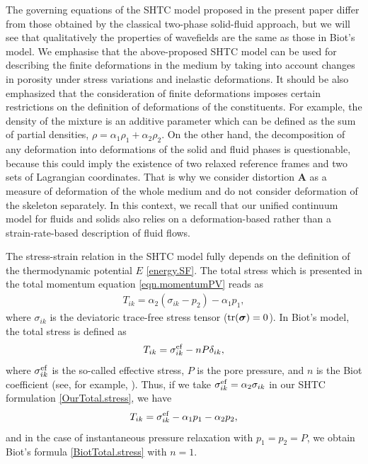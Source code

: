 \documentclass[3p,times,table]{article}
\renewcommand{\AA}{{\bm{A}}}
\newcommand{\tr}{\textnormal{tr}}
\begin{document}
The governing equations of the SHTC model proposed in the present paper differ from 
those obtained by the classical two-phase solid-fluid approach, but we will see 
that qualitatively the properties of wavefields are the same as those in 
Biot's model.
We emphasise that the above-proposed SHTC model can be used for describing the finite deformations in the medium by taking into account changes in porosity under stress variations and inelastic deformations. 
It should be also emphasized that the consideration of finite deformations 
imposes certain restrictions on the definition of deformations of the constituents. 
For example, the density of the mixture is an additive parameter which can be 
defined as the sum of partial densities, $ \rho=\alpha_1 \rho_1 + \alpha_2 
\rho_2$. On the other hand, the decomposition of any deformation into 
deformations of the solid and fluid phases is questionable, because this could 
imply the existence of two relaxed reference frames and two sets of Lagrangian 
coordinates. That is why we consider distortion $\AA$ as a measure of 
deformation of the whole medium and do not consider deformation of the skeleton 
separately. In this context, we recall that our unified continuum model 
for fluids and solids \cite{HPR2016,DPRZ2016,HYP2016} also relies on a 
deformation-based rather than a strain-rate-based description of fluid flows.

The stress-strain relation in the SHTC model fully depends on the definition of 
the thermodynamic potential $ E $ \eqref{energy.SF}. The total stress which is 
presented in the total momentum equation \eqref{eqn.momentumPV} reads as 
\begin{align}\label{OurTotal.stress}
T_{ik}=\alpha_2 (\sigma_{ik}-p_2)-\alpha_1 p_1,
\end{align}
where $\sigma_{ik}$ is the deviatoric trace-free stress tensor ($\tr 
(\bm{\sigma})=0$). 
In Biot's model, the total stress is defined as 
\begin{align}\label{BiotTotal.stress}
T_{ik}=\sigma^{\rm ef}_{ik}-n P\delta_{ik},
\end{align}
where $\sigma^{\rm ef}_{ik}$ is the so-called effective stress, $P$ is the pore 
pressure, and $n$ is the Biot coefficient (see, for example, 
\cite{Merxhani2016}). 
Thus, if we take $\sigma^{\rm ef}_{ik}=\alpha_2\sigma_{ik}$ in our SHTC 
formulation \eqref{OurTotal.stress}, we have
\begin{equation}
T_{ik}=\sigma^{\rm ef}_{ik}-\alpha_1 p_1- \alpha_2 p_2,
\end{equation}
and in the case of instantaneous pressure relaxation with $p_1=p_2=P$, we 
obtain Biot's formula \eqref{BiotTotal.stress} with 
$n=1$.
\end{document}

